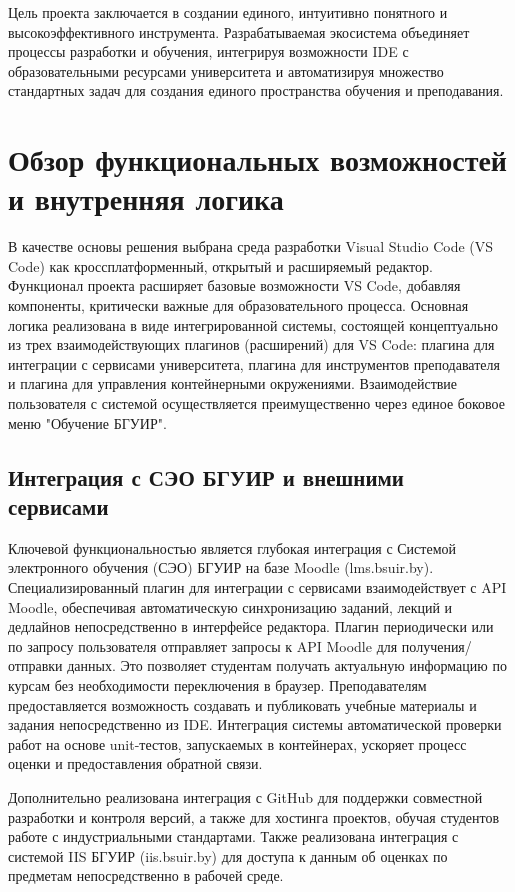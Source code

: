 \documentclass{bsuir}
\begin{document}
Цель проекта заключается в создании единого, интуитивно понятного и высокоэффективного
инструмента. Разрабатываемая экосистема объединяет процессы разработки и обучения,
интегрируя возможности IDE с образовательными ресурсами университета и автоматизируя
множество стандартных задач для создания единого пространства обучения и преподавания.

\section{Обзор функциональных возможностей и внутренняя логика}

В качестве основы решения выбрана среда разработки Visual Studio Code (VS Code) как
кроссплатформенный, открытый и расширяемый редактор. Функционал проекта расширяет
базовые возможности VS Code, добавляя компоненты, критически важные для образовательного
процесса. Основная логика реализована в виде интегрированной системы, состоящей
концептуально из трех взаимодействующих плагинов (расширений) для VS Code: плагина
для интеграции с сервисами университета, плагина для инструментов преподавателя
и плагина для управления контейнерными окружениями. Взаимодействие пользователя
с системой осуществляется преимущественно через единое боковое меню "Обучение БГУИР".

\subsection{Интеграция с СЭО БГУИР и внешними сервисами}

Ключевой функциональностью является глубокая интеграция с Системой электронного
обучения (СЭО) БГУИР на базе Moodle (lms.bsuir.by). Специализированный плагин для
интеграции с сервисами взаимодействует с API Moodle, обеспечивая автоматическую
синхронизацию заданий, лекций и дедлайнов непосредственно в интерфейсе редактора.
Плагин периодически или по запросу пользователя отправляет запросы к API Moodle для
получения/отправки данных. Это позволяет студентам получать актуальную информацию
по курсам без необходимости переключения в браузер. Преподавателям предоставляется
возможность создавать и публиковать учебные материалы и задания непосредственно из IDE.
Интеграция системы автоматической проверки работ на основе unit-тестов, запускаемых
в контейнерах, ускоряет процесс оценки и предоставления обратной связи.

Дополнительно реализована интеграция с GitHub для поддержки совместной разработки
и контроля версий, а также для хостинга проектов, обучая студентов работе с
индустриальными стандартами. Также реализована интеграция с системой IIS БГУИР
(iis.bsuir.by) для доступа к данным об оценках по предметам непосредственно в
рабочей среде.
\end{document}

